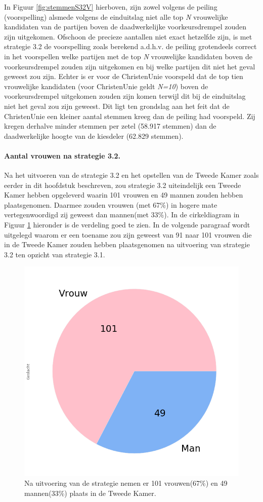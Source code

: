 In Figuur \ref{fig:stemmenS32V} hierboven, zijn zowel volgens de peiling (voorspelling) alsmede volgens de einduitslag niet alle top \textit{N} vrouwelijke kandidaten van de partijen boven de daadwerkelijke voorkeursdrempel zouden zijn uitgekomen. Ofschoon de precieze aantallen niet exact hetzelfde zijn, is met strategie 3.2 de voorspelling zoals berekend a.d.h.v. de peiling grotendeels correct in het voorspellen welke partijen met de top \textit{N} vrouwelijke kandidaten boven de voorkeursdrempel zouden zijn uitgekomen en bij welke partijen dit niet het geval geweest zou zijn. Echter is er voor de ChristenUnie voorspeld dat de top tien vrouwelijke kandidaten (voor ChristenUnie geldt \textit{N=10}) boven de voorkeursdrempel uitgekomen zouden zijn komen terwijl dit bij de einduitslag niet het geval zou zijn geweest. Dit ligt ten grondslag aan het feit dat de ChristenUnie een kleiner aantal stemmen kreeg dan de peiling had voorspeld. Zij kregen derhalve minder stemmen per zetel (58.917 stemmen) dan de daadwerkelijke hoogte van de kiesdeler (62.829 stemmen). 

\paragraph{Aantal vrouwen na strategie 3.2.}
Na het uitvoeren van de strategie 3.2 en het opstellen van de Tweede Kamer zoals eerder in dit hoofdstuk beschreven, zou strategie 3.2 uiteindelijk een Tweede Kamer hebben opgeleverd waarin 101 vrouwen en 49 mannen zouden hebben plaatsgenomen. Daarmee zouden vrouwen (met 67\%) in hogere mate vertegenwoordigd zij geweest dan mannen(met 33\%). In de cirkeldiagram in Figuur \ref{fig:pcS32V} hieronder is de verdeling goed te zien. In de volgende paragraaf wordt uitgelegd waarom er een toename zou zijn geweest van 91 naar 101 vrouwen die in de Tweede Kamer zouden hebben plaatsgenomen na uitvoering van strategie 3.2 ten opzicht van strategie 3.1.

\begin{figure}[H]
\centering
	\includegraphics[width=0.35\linewidth]{pie_chart_eigenX.png}

			\caption{Na uitvoering van de strategie nemen er 101 vrouwen(67\%) en 49 mannen(33\%) plaats in de Tweede Kamer.}

\label{fig:pcS32V}
\end{figure}

